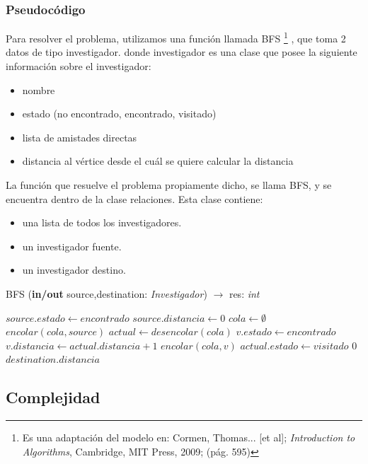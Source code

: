 \subsubsection{Pseudocódigo}

\indent Para resolver el problema, utilizamos una función  llamada BFS \footnote{Es una adaptación del modelo en: Cormen, Thomas... [et al]; \textit{Introduction to Algorithms}, Cambridge, MIT Press, 2009; (p\'ag. 595)}
, que toma
2 datos de tipo investigador. donde investigador es una clase que posee la
siguiente información sobre el investigador:
\begin{itemize}
	\item nombre
	\item estado (no encontrado, encontrado, visitado)
	\item lista de amistades directas
	\item distancia al vértice desde el cuál se quiere calcular la distancia
\end{itemize}
\indent La función que resuelve el problema propiamente dicho, se llama BFS, y
se encuentra dentro de la clase relaciones. Esta clase contiene:
\begin{itemize}
\item una lista de todos los investigadores.
\item un investigador fuente.
\item un investigador destino.
\end{itemize}

\begin{algorithm}
\caption{BFS (\textbf{in/out} source,destination: \textsl{Investigador}) $\rightarrow$ res: \textsl{int}}
\begin{algorithmic}[1]

\STATE $source.estado \leftarrow encontrado$
\STATE $source.distancia \leftarrow 0$
\STATE $cola \leftarrow \emptyset$
\STATE $encolar(cola,source)$
	\STATE $actual \leftarrow desencolar(cola)$
			\STATE $v.estado \leftarrow encontrado$
			\STATE $v.distancia \leftarrow actual.distancia + 1$
			\STATE $encolar(cola,v)$
		\ENDIF
	\ENDFOR
	\STATE $actual.estado \leftarrow visitado$
\ENDWHILE
{}
	\RETURN $0$
\ELSE
	\RETURN $destination.distancia$
\ENDIF
\end{algorithmic}
\end{algorithm}

\subsection{Complejidad}

